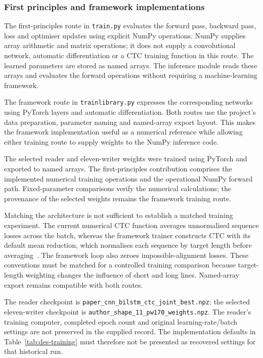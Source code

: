 \subsubsection{First principles and framework implementations}
\label{sec:des-implementations}
The first-principles route in \texttt{train.py} evaluates the forward pass, backward pass, loss and optimiser updates using explicit NumPy operations. NumPy supplies array arithmetic and matrix operations; it does not supply a convolutional network, automatic differentiation or a CTC training function in this route. The learned parameters are stored as named arrays. The inference module reads these arrays and evaluates the forward operations without requiring a machine-learning framework.


The framework route in \texttt{trainlibrary.py} expresses the corresponding networks using PyTorch layers and automatic differentiation. Both routes use the project's data preparation, parameter naming and named-array export layout. This makes the framework implementation useful as a numerical reference while allowing either training route to supply weights to the NumPy inference code.

The selected reader and eleven-writer weights were trained using PyTorch and exported to named arrays. The first-principles contribution comprises the implemented numerical training operations and the operational NumPy forward path. Fixed-parameter comparisons verify the numerical calculations; the provenance of the selected weights remains the framework training route.

Matching the architecture is not sufficient to establish a matched training experiment. The current numerical CTC function averages unnormalised sequence losses across the batch, whereas the framework trainer constructs CTC with its default mean reduction, which normalises each sequence by target length before averaging~\cite[CTCLoss, ``Parameters'' ]{pytorchctc}. The framework loop also zeroes impossible-alignment losses. These conventions must be matched for a controlled training comparison because target-length weighting changes the influence of short and long lines. Named-array export remains compatible with both routes.

The reader checkpoint is \texttt{paper\_cnn\_bilstm\_ctc\_joint\_best.npz}; the selected eleven-writer checkpoint is \texttt{author\_shape\_11\_pw170\_weights.npz}. The reader's training computer, completed epoch count and original learning-rate/batch settings are not preserved in the supplied record. The implementation defaults in Table~\ref{tab:des-training} must therefore not be presented as recovered settings for that historical run.


